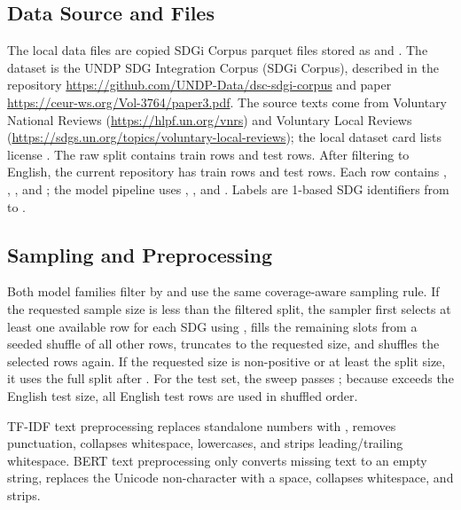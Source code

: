 \documentclass[12pt,a4paper]{article}
\begin{document}
\subsection{Data Source and Files}

The local data files are copied SDGi Corpus parquet files stored as  and . The dataset is the UNDP SDG Integration Corpus (SDGi Corpus), described in the repository \url{https://github.com/UNDP-Data/dsc-sdgi-corpus} and paper \url{https://ceur-ws.org/Vol-3764/paper3.pdf}. The source texts come from Voluntary National Reviews (\url{https://hlpf.un.org/vnrs}) and Voluntary Local Reviews (\url{https://sdgs.un.org/topics/voluntary-local-reviews}); the local dataset card lists license . The raw split contains  train rows and  test rows. After filtering to English, the current repository has  train rows and  test rows. Each row contains , , , and ; the model pipeline uses , , and . Labels are 1-based SDG identifiers from  to .

\subsection{Sampling and Preprocessing}

Both model families filter by  and use the same coverage-aware sampling rule. If the requested sample size is less than the filtered split, the sampler first selects at least one available row for each SDG using , fills the remaining slots from a seeded shuffle of all other rows, truncates to the requested size, and shuffles the selected rows again. If the requested size is non-positive or at least the split size, it uses the full split after . For the test set, the sweep passes ; because  exceeds the English test size, all  English test rows are used in shuffled order.

TF-IDF text preprocessing replaces standalone numbers with , removes punctuation, collapses whitespace, lowercases, and strips leading/trailing whitespace. BERT text preprocessing only converts missing text to an empty string, replaces the Unicode non-character  with a space, collapses whitespace, and strips.
\end{document}
